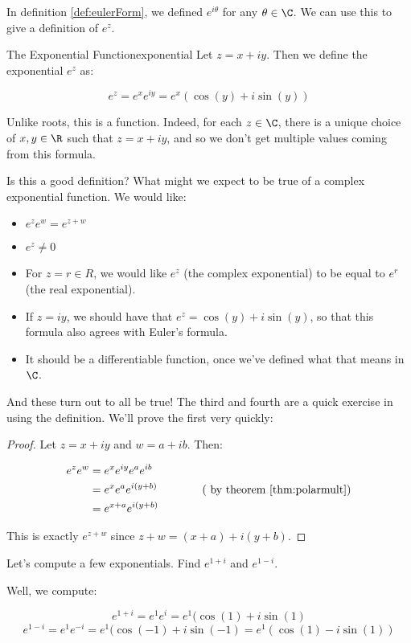In definition \ref{def:eulerForm}, we defined $e^{i\theta}$ for any $\theta \in \C$. We can use this to give a definition of $e^z$.

\begin{defbo}{The Exponential Function}{exponential} 
Let $z = x + iy$. Then we define the exponential $e^z$ as:

$$e^z = e^xe^{iy} = e^x(\cos(y) + i\sin(y))$$
\end{defbo}

Unlike roots, this is a function. Indeed, for each $z\in \C$, there is a unique choice of $x,y\in \R$ such that $z = x+iy$, and so we don't get multiple values coming from this formula.

Is this a good definition? What might we expect to be true of a complex exponential function. We would like:

\begin{itemize}
\item $e^ze^w = e^{z + w}$
\item $e^z \ne 0$
\item For $z = r\in R$, we would like $e^z$ (the complex exponential) to be equal to $e^r$ (the real exponential).
\item If $z = iy$, we should have that $e^z = \cos(y) + i\sin(y)$, so that this formula also agrees with Euler's formula.
\item It should be a differentiable function, once we've defined what that means in $\C$.

\end{itemize}


And these turn out to all be true! The third and fourth are a quick exercise in using the definition. We'll prove the first very quickly:

\begin{proof} Let $z = x + iy$ and $w = a + ib$. Then:

\begin{align*} e^ze^w &= e^xe^{iy}e^ae^{ib} \\
&= e^xe^ae^{i(y+b)} \qquad \qquad (\text{ by theorem }\ref{thm:polarmult})\\
&= e^{x+a}e^{i(y+b)}\end{align*}

This is exactly $e^{z + w}$ since $z + w = (x+a) + i(y+b)$.\end{proof}


\begin{ex}{}{} Let's compute a few exponentials. Find $e^{1 + i}$ and $e^{1-i}$.

Well, we compute:

$$e^{1 + i} = e^1e^{i} = e^1(\cos(1) + i\sin(1)$$
$$e^{1 - i} = e^1e^{-i} = e^1(\cos(-1) + i\sin(-1) = e^1(\cos(1) - i\sin(1))$$

\end{ex}

